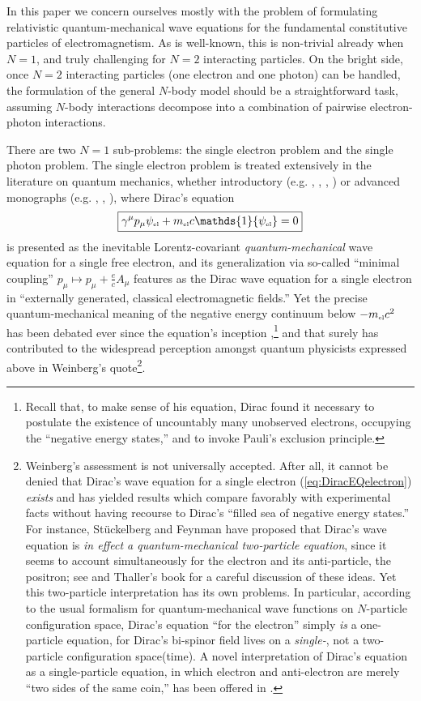 \documentclass[11pt]{article}
\theoremstyle{definition}
\newcommand{\refeq}[1]{(\ref{#1})}
\numberwithin{equation}{section}
\newcommand{\beq}{\begin{equation}}
\newcommand{\eeq}{\end{equation}}
\newcommand{\Id}{\mathds{1}}
\newcommand{\psiEL}{{\psi_{\mbox{\rm\tiny el}}}}
\newcommand{\mEL}{{m_{\mbox{\rm\tiny el}}}}
\newcommand{\ga}{\gamma}
\begin{document}
 In this paper we concern ourselves mostly with the problem of formulating relativistic quantum-mechanical wave equations for
the fundamental constitutive particles of electromagnetism.
 As is well-known, this is non-trivial already when $N=1$, and truly challenging for $N=2$ interacting particles. 
 On the bright side,  once $N=2$ interacting particles (one electron and one photon) can be handled, the formulation of the 
general $N$-body model should be a straightforward task, assuming $N$-body interactions decompose into a combination of pairwise 
electron-photon interactions.

 There are two $N=1$ sub-problems: the single electron problem and the single photon problem.
 The single electron problem is treated extensively in the literature on quantum mechanics,
whether introductory (e.g. \cite{Dirac1930}, \cite{LandauLifshitzBOOKrelQM}, \cite{BohmBOOKonQM}, \cite{MessiahQMbook}) 
or advanced monographs (e.g. \cite{GreinerETal}, \cite{ThallerBOOK}, \cite{WeinbergBOOKqft}), 
where Dirac's equation \cite{Dirac1928a,Dirac1928b} 
\beq \label{eq:DiracEQelectron} 
\boxed{\ga^\mu p_\mu \psiEL + \mEL c \Id \psiEL =0}
\eeq
is presented as the inevitable Lorentz-covariant \emph{quantum-mechanical} wave equation for a single free electron,
and its generalization via so-called ``minimal coupling'' $p_\mu\mapsto p_\mu + \frac{e}{c}A_\mu$ features as the Dirac wave 
equation for a single electron in ``externally generated, classical electromagnetic fields.'' 
 Yet the precise quantum-mechanical meaning of the negative energy continuum below $-\mEL c^2$ 
has been debated ever since the equation's inception \cite{Dirac1928a,Dirac1928b},\footnote{Recall 
  that, to make sense of his equation, Dirac found it necessary to postulate the existence of uncountably many unobserved
 electrons, occupying the ``negative energy states,'' and to invoke Pauli's exclusion principle.}
and that surely has contributed to the widespread perception amongst quantum physicists expressed above in Weinberg's quote\footnote{Weinberg's assessment is not universally accepted. After all, it cannot be denied that Dirac's wave equation 
for a single electron \refeq{eq:DiracEQelectron} \emph{exists} and has yielded results which compare 
favorably with experimental facts without having recourse to Dirac's ``filled sea of negative energy states.''
 For instance, St\"uckelberg \cite{Stueckelberg} and Feynman \cite{FeynmanD} have proposed that Dirac's wave equation is 
\emph{in effect a quantum-mechanical two-particle equation}, since it seems to account simultaneously for the electron and its 
anti-particle, the positron; see \cite{Thaller} and Thaller's book \cite{ThallerBOOK} for a careful discussion of these ideas. 
 Yet this two-particle interpretation has its own problems. 
 In particular, according to the usual formalism for quantum-mechanical wave functions on $N$-particle configuration space,
Dirac's equation ``for the electron'' simply \emph{is} a one-particle equation, for Dirac's bi-spinor field lives on a 
  \emph{single-}, not a two-particle configuration space(time). 
 A novel interpretation of Dirac's equation as a single-particle equation, in which electron and anti-electron are merely
``two sides of the same coin,'' has been offered in \cite{KTZzGKNDiia}.}.
\end{document}
